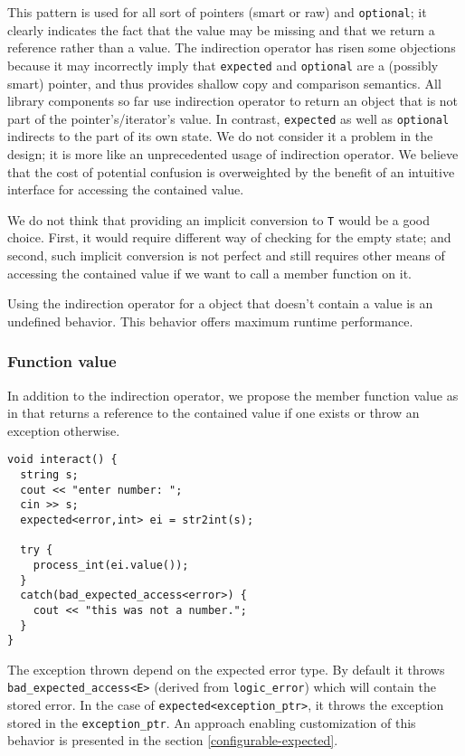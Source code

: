 \documentclass[a4paper,10pt]{article}
\newcommand{\cpp}[1]{\lstinline{#1}}
\begin{document}
This pattern is used for all sort of pointers (smart or raw) and \cpp{optional}; it clearly indicates the fact that the value may be missing and that we return a reference rather than a value. The indirection operator has risen some objections because it may incorrectly imply that \cpp{expected} and \cpp{optional} are a (possibly smart) pointer, and thus provides shallow copy and comparison semantics. All library components so far use indirection operator to return an object that is not part of the pointer's/iterator's value. In contrast, \cpp{expected} as well as \cpp{optional} indirects to the part of its own state. We do not consider it a problem in the design; it is more like an unprecedented usage of indirection operator. We believe that the cost of potential confusion is overweighted by the benefit of an intuitive interface for accessing the contained value.

We do not think that providing an implicit conversion to \cpp{T} would be a good choice. First, it would require different way of checking for the empty state; and second, such implicit conversion is not perfect and still requires other means of accessing the contained value if we want to call a member function on it.

Using the indirection operator for a object that doesn't contain a value is an undefined behavior. This behavior offers maximum runtime performance.

\subsubsection{Function value}

In addition to the indirection operator, we propose the member function value as in \cite{OptionalRev4} that returns a reference to the contained value if one exists or throw an exception otherwise.

\begin{lstlisting}
void interact() {
  string s;
  cout << "enter number: ";
  cin >> s;
  expected<error,int> ei = str2int(s);
  
  try {
    process_int(ei.value());
  }
  catch(bad_expected_access<error>) {
    cout << "this was not a number.";
  }
}
\end{lstlisting}

The exception thrown depend on the expected error type. By default it throws \cpp{bad_expected_access<E>} (derived from \cpp{logic_error}) which will contain the stored error. In the case of \cpp{expected<exception_ptr>}, it throws the exception stored in the \cpp{exception_ptr}. An approach enabling customization of this behavior is presented in the section \ref{configurable-expected}.
\end{document}

